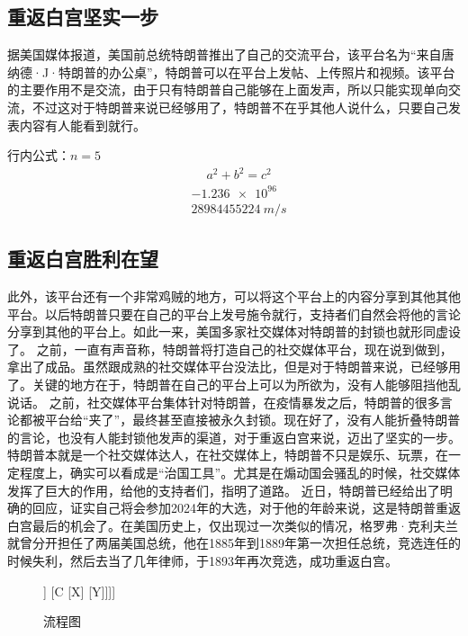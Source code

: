 \documentclass[a4paper,11pt]{ctexart}
\begin{document}
	\subsection{重返白宫坚实一步}
	据美国媒体报道，美国前总统特朗普推出了自己的交流平台，该平台名为“来自唐纳德·J·特朗普的办公桌”，特朗普可以在平台上发帖、上传照片和视频。该平台的主要作用不是交流，由于只有特朗普自己能够在上面发声，所以只能实现单向交流，不过这对于特朗普来说已经够用了，特朗普不在乎其他人说什么，只要自己发表内容有人能看到就行。
	
	行内公式：$ n = 5$
	\begin{equation}
		\begin{aligned}
			& a^2 + b^2 = c^2
		\end{aligned}
	\end{equation}
	\begin{equation}
		\begin{aligned}
			& \num{-1.236e96} \\
			& \SI{28984455224}{m/s}
		\end{aligned}
	\end{equation}
	\subsection{重返白宫胜利在望}
	此外，该平台还有一个非常鸡贼的地方，可以将这个平台上的内容分享到其他其他平台。以后特朗普只要在自己的平台上发号施令就行，支持者们自然会将他的言论分享到其他的平台上。如此一来，美国多家社交媒体对特朗普的封锁也就形同虚设了。
	之前，一直有声音称，特朗普将打造自己的社交媒体平台，现在说到做到，拿出了成品。虽然跟成熟的社交媒体平台没法比，但是对于特朗普来说，已经够用了。关键的地方在于，特朗普在自己的平台上可以为所欲为，没有人能够阻挡他乱说话。
	之前，社交媒体平台集体针对特朗普，在疫情暴发之后，特朗普的很多言论都被平台给“夹了”，最终甚至直接被永久封锁。现在好了，没有人能折叠特朗普的言论，也没有人能封锁他发声的渠道，对于重返白宫来说，迈出了坚实的一步。
	特朗普本就是一个社交媒体达人，在社交媒体上，特朗普不只是娱乐、玩票，在一定程度上，确实可以看成是“治国工具”。尤其是在煽动国会骚乱的时候，社交媒体发挥了巨大的作用，给他的支持者们，指明了道路。
	近日，特朗普已经给出了明确的回应，证实自己将会参加2024年的大选，对于他的年龄来说，这是特朗普重返白宫最后的机会了。在美国历史上，仅出现过一次类似的情况，格罗弗·克利夫兰就曾分开担任了两届美国总统，他在1885年到1889年第一次担任总统，竞选连任的时候失利，然后去当了几年律师，于1893年再次竞选，成功重返白宫。
	\begin{figure}
		\centering
		\begin{forest}
			[A [B [D] [E]] [C [X] [Y]]]]
		\end{forest}
		\caption{流程图}
	\end{figure}
	
\end{document}
